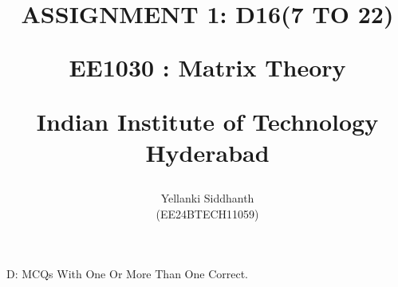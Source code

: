 \documentclass[journal,12pt,twocolumn]{IEEEtran}
\theoremstyle{remark}
\begin{document}
%





\title{
ASSIGNMENT 1: D16(7 TO 22)

\large{EE1030 : Matrix Theory}

Indian Institute of Technology Hyderabad
}
\author{Yellanki Siddhanth

(EE24BTECH11059)
}	





\maketitle

\newpage



\bigskip

\renewcommand{\thefigure}{\theenumi}
\renewcommand{\thetable}{\theenumi}
 
    
        {D: MCQs With One Or More Than One Correct.}
    
\end{document}
